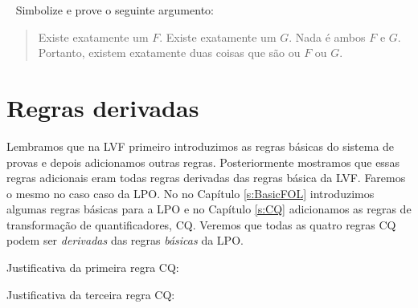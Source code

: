 \
\problempart
Simbolize e prove o seguinte argumento:
	\begin{quote}
		Existe exatamente um $F$. Existe exatamente um $G$. Nada é ambos $F$ e $G$. Portanto, existem exatamente duas coisas que  são ou $F$ ou $G$.
	\end{quote}
 



\chapter{Regras derivadas}\label{s:DerivedFOL}
Lembramos que na LVF primeiro introduzimos as regras básicas do sistema de provas e depois adicionamos outras regras.  Posteriormente mostramos que essas regras adicionais eram todas regras derivadas das regras básica da LVF. Faremos o mesmo no caso caso da LPO.  No no Capítulo  \ref{s:BasicFOL} introduzimos algumas regras básicas para a LPO e no Capítulo  \ref{s:CQ} adicionamos  as  regras de transformação de quantificadores, CQ.  Veremos que todas as quatro regras CQ podem ser \emph{derivadas} das regras \emph{básicas} da LPO.  

Justificativa da primeira regra CQ:
\begin{fitchproof}
	\open
		\open
		\close
	\close
\end{fitchproof}
Justificativa da terceira regra CQ:
   
